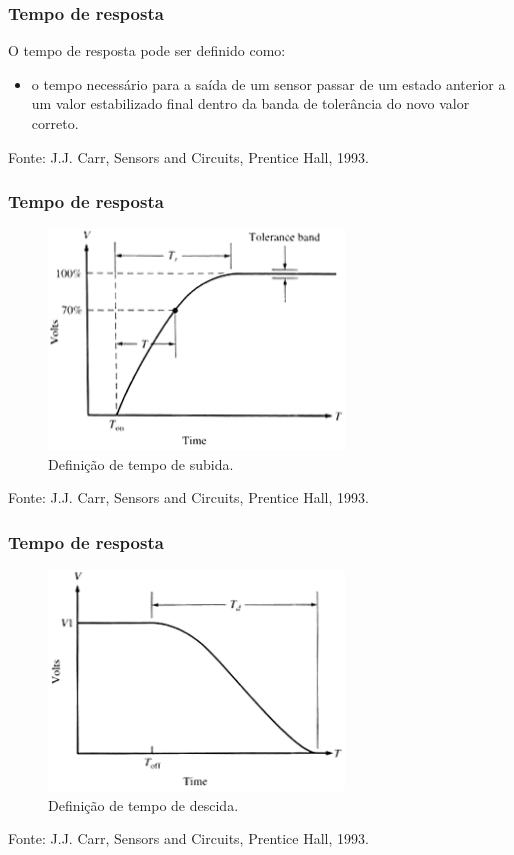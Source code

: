 \documentclass[t]{beamer}
\begin{document}
\begin{frame}
	\frametitle{Tempo de resposta}
	O tempo de resposta pode ser definido como:
	\begin{itemize}
		\item o tempo necessário para a saída de um sensor passar de um estado anterior a um valor estabilizado final dentro da banda de tolerância do novo valor correto.
	\end{itemize}
	{\scriptsize Fonte: J.J. Carr, Sensors and Circuits, Prentice Hall, 1993.}
\end{frame}

\begin{frame}
	\frametitle{Tempo de resposta}
	\begin{figure}
		\includegraphics[width=0.7\textwidth]{tempoderespostasubida}
		\caption{Definição de tempo de subida.}
	\end{figure}  	
	{\scriptsize Fonte: J.J. Carr, Sensors and Circuits, Prentice Hall, 1993.}
\end{frame}

\begin{frame}
	\frametitle{Tempo de resposta}
	\begin{figure}
		\includegraphics[width=0.7\textwidth]{tempoderepostadescida}
		\caption{Definição de tempo de descida.}
	\end{figure}  	
	{\scriptsize Fonte: J.J. Carr, Sensors and Circuits, Prentice Hall, 1993.}
\end{frame}
\end{document}
